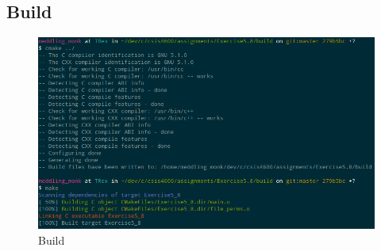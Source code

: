 \documentclass[a4paper,12pt,sffamily]{article}
\begin{document}
\subsection{Build}
\begin{figure}[H]
\centering
\includegraphics[width=1\linewidth]{./images/0}
\caption[build_1]{Build}
\label{fig:1}
\end{figure}
\end{document}
